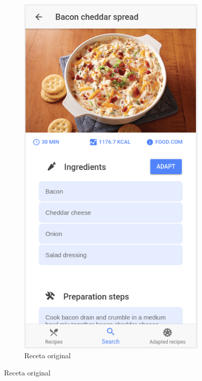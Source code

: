 \begin{figure}[H]
    \centering
    \begin{subfigure}[b]{0.31\linewidth}
        \includegraphics[width=\linewidth]{imagenes/app/pantallas/ejemplo8.png}
        \caption{Receta original}
        \label{fig:ejemplo8}

\end{subfigure}
\end{figure}
